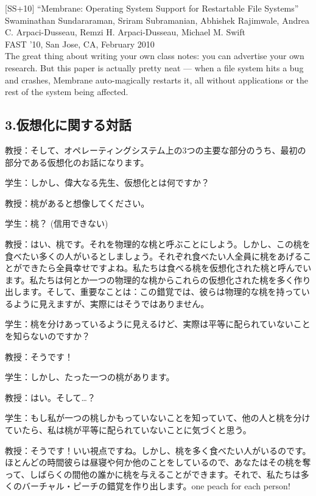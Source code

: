 {[}SS+10{]} ``Membrane: Operating System Support for Restartable File
Systems''\\
Swaminathan Sundararaman, Sriram Subramanian, Abhishek Rajimwale, Andrea
C. Arpaci-Dusseau, Remzi H. Arpaci-Dusseau, Michael M. Swift\\
FAST '10, San Jose, CA, February 2010\\
The great thing about writing your own class notes: you can advertise
your own research. But this paper is actually pretty neat --- when a
file system hits a bug and crashes, Membrane auto-magically restarts it,
all without applications or the rest of the system being affected.

\hypertarget{ux4eeeux60f3ux5316ux306bux95a2ux3059ux308bux5bfeux8a71}{%
\subsection*{3.仮想化に関する対話}\label{ux4eeeux60f3ux5316ux306bux95a2ux3059ux308bux5bfeux8a71}}

教授：そして、オペレーティングシステム上の3つの主要な部分のうち、最初の部分である仮想化のお話になります。

学生：しかし、偉大なる先生、仮想化とは何ですか？

教授：桃があると想像してください。

学生：桃？ (信用できない)

教授：はい、桃です。それを物理的な桃と呼ぶことにしよう。しかし、この桃を食べたい多くの人がいるとしましょう。それぞれ食べたい人全員に桃をあげることができたら全員幸せですよね。私たちは食べる桃を仮想化された桃と呼んでいます。私たちは何とか一つの物理的な桃からこれらの仮想化された桃を多く作り出します。そして、重要なことは：この錯覚では、彼らは物理的な桃を持っているように見えますが、実際にはそうではありません。

学生：桃を分けあっているように見えるけど、実際は平等に配られていないことを知らないのですか？

教授：そうです！

学生：しかし、たった一つの桃があります。

教授：はい。そして\ldots？

学生：もし私が一つの桃しかもっていないことを知っていて、他の人と桃を分けていたら、私は桃が平等に配られていないことに気づくと思う。

教授：そうです！いい視点ですね。しかし、桃を多く食べたい人がいるのです。ほとんどの時間彼らは昼寝や何か他のことをしているので、あなたはその桃を奪って、しばらくの間他の誰かに桃を与えることができます。それで、私たちは多くのバーチャル・ピーチの錯覚を作り出します。one
peach for each person!

